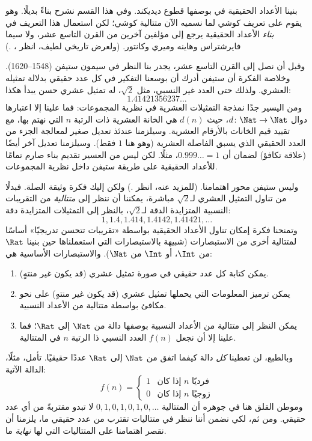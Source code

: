 \documentclass[../../../include/open-logic-section]{subfiles}
\begin{document}


بنينا الأعداد الحقيقية في  بوصفها قطوع ديديكند. وفي
هذا القسم نشرح بناءً بديلًا. وهو يقوم على تعريف كوشي لما نسميه الآن
متتالية كوشي؛ لكن استعمال هذا التعريف في \emph{بناء} الأعداد الحقيقية
يرجع إلى مؤلفين آخرين من القرن التاسع عشر، ولا سيما فايرشتراس وهاينه
وميري وكانتور. (ولعرض تاريخي لطيف، انظر
\citeauthor{OConnorRobertson:RN}،
\citeyear{OConnorRobertson:RN}.)

وقبل أن نصل إلى القرن التاسع عشر، يجدر بنا النظر في سيمون ستيفن
(1548--1620). وخلاصة الفكرة أن ستيفن أدرك أن بوسعنا التفكير في كل عدد
حقيقي بدلالة تمثيله العشري. ولذلك حتى العدد غير النسبي، مثل $\sqrt{2}$،
له تمثيل عشري حسن يبدأ هكذا:
\[
	1.41421356237\ldots
\] 
ومن اليسير جدًا نمذجة التمثيلات العشرية في نظرية المجموعات: فما علينا
إلا اعتبارها دوال $d \colon \Nat \to \Nat$، حيث $d(n)$ هي الخانة
العشرية ذات الرتبة $n$ التي نهتم بها، مع تقييد قيم الخانات بالأرقام
العشرية. وسيلزمنا عندئذ تعديل صغير لمعالجة
الجزء من العدد الحقيقي الذي يسبق الفاصلة العشرية (وهو هنا $1$ فقط).
وسيلزمنا تعديل آخر أيضًا (علاقة تكافؤ) لضمان أن $0.999\ldots = 1$،
مثلًا. لكن ليس من العسير تقديم بناء صارم تمامًا للأعداد الحقيقية على
طريقة ستيفن داخل نظرية المجموعات.

وليس ستيفن محور اهتمامنا. (للمزيد عنه، انظر
\citealt{KatzKatz2012}.) ولكن إليك فكرة وثيقة الصلة. فبدلًا من تناول
التمثيل العشري لـ$\sqrt{2}$ مباشرة، يمكننا أن ننظر إلى \emph{متتالية}
من التقريبات النسبية المتزايدة الدقة لـ$\sqrt{2}$، بالنظر إلى
التمثيلات المتزايدة دقة:
\[
1, 1.4, 1.414, 1.4142, 1.41421,\ldots
\]
وتمنحنا فكرة إمكان تناول الأعداد الحقيقية بواسطة «تقريبات تتحسن
تدريجيًا» أساسًا لمتتالية أخرى من الاستبصارات (شبيهة بالاستبصارات التي
استعملناها حين بنينا $\Rat$ من $\Int$، أو $\Int$ من $\Nat$).
والاستبصارات الأساسية هي:
\begin{enumerate}
	\item يمكن كتابة كل عدد حقيقي في صورة تمثيل عشري (قد يكون غير
	منتهٍ).
	\item يمكن ترميز المعلومات التي يحملها تمثيل عشري (قد يكون غير
	منتهٍ) على نحو مكافئ بواسطة متتالية من الأعداد النسبية.
	\item يمكن النظر إلى متتالية من الأعداد النسبية بوصفها دالة من
	$\Nat$ إلى $\Rat$؛ فما علينا إلا أن نجعل $f(n)$ العدد النسبي ذا
	الرتبة $n$ في المتتالية.
\end{enumerate}
وبالطبع، لن تعطينا \emph{كل} دالة كيفما اتفق من $\Nat$ إلى $\Rat$
عددًا حقيقيًا. تأمل، مثلًا، الدالة الآتية:
\[
	f(n) =\begin{cases}
			1 & \text{إذا كان }n\text{ فرديًا}\\
			0 &\text{إذا كان }n\text{ زوجيًا}
		\end{cases}
\]
وموطن القلق هنا في جوهره أن المتتالية $0,1,0,1,0,1,0,\ldots$ لا تبدو
مقتربةً من أي عدد حقيقي. ومن ثم، لكي نضمن أننا ننظر في متتاليات تقترب
من عدد حقيقي ما، يلزمنا أن نقصر اهتمامنا على المتتاليات التي لها
\emph{نهاية} ما.
\end{document}
